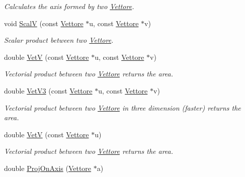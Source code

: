 \begin{DoxyCompactItemize}
\begin{DoxyCompactList}\small\item\em Calculates the axis formed by two \hyperlink{classVettore}{Vettore}. \end{DoxyCompactList}\item 
void \hyperlink{classVettore_acde6fcf2886d08085f11655e0bb4fa5a}{ScalV} (const \hyperlink{classVettore}{Vettore} $\ast$u, const \hyperlink{classVettore}{Vettore} $\ast$v)\hypertarget{classVettore_acde6fcf2886d08085f11655e0bb4fa5a}{}\label{classVettore_acde6fcf2886d08085f11655e0bb4fa5a}

\begin{DoxyCompactList}\small\item\em Scalar product between two \hyperlink{classVettore}{Vettore}. \end{DoxyCompactList}\item 
double \hyperlink{classVettore_a9b3422c7c865368c649cb008c6185250}{VetV} (const \hyperlink{classVettore}{Vettore} $\ast$u, const \hyperlink{classVettore}{Vettore} $\ast$v)\hypertarget{classVettore_a9b3422c7c865368c649cb008c6185250}{}\label{classVettore_a9b3422c7c865368c649cb008c6185250}

\begin{DoxyCompactList}\small\item\em Vectorial product between two \hyperlink{classVettore}{Vettore} returns the area. \end{DoxyCompactList}\item 
double \hyperlink{classVettore_a95399bdbce8cbb4ad68d53d914a68d76}{Vet\+V3} (const \hyperlink{classVettore}{Vettore} $\ast$u, const \hyperlink{classVettore}{Vettore} $\ast$v)\hypertarget{classVettore_a95399bdbce8cbb4ad68d53d914a68d76}{}\label{classVettore_a95399bdbce8cbb4ad68d53d914a68d76}

\begin{DoxyCompactList}\small\item\em Vectorial product between two \hyperlink{classVettore}{Vettore} in three dimension (faster) returns the area. \end{DoxyCompactList}\item 
double \hyperlink{classVettore_a23d7adb61da0e99cc2fab9dbab01f7d8}{VetV} (const \hyperlink{classVettore}{Vettore} $\ast$u)\hypertarget{classVettore_a23d7adb61da0e99cc2fab9dbab01f7d8}{}\label{classVettore_a23d7adb61da0e99cc2fab9dbab01f7d8}

\begin{DoxyCompactList}\small\item\em Vectorial product between two \hyperlink{classVettore}{Vettore} returns the area. \end{DoxyCompactList}\item 
double \hyperlink{classVettore_a060c730e982c30a0530598d864a6e508}{Proj\+On\+Axis} (\hyperlink{classVettore}{Vettore} $\ast$a)\hypertarget{classVettore_a060c730e982c30a0530598d864a6e508}{}\label{classVettore_a060c730e982c30a0530598d864a6e508}


\end{DoxyCompactItemize}
